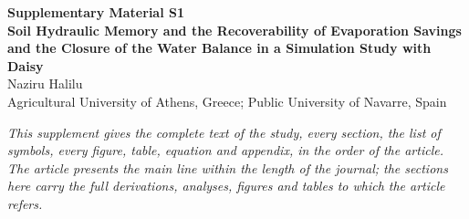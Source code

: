 \documentclass[preprint,12pt,authoryear]{elsarticle}
\begin{document}
\renewcommand{\thesection}{S\arabic{section}}\renewcommand{\thefigure}{S\arabic{figure}}\renewcommand{\thetable}{S\arabic{table}}\renewcommand{\theequation}{S\arabic{equation}}
\begin{center}{\Large\bfseries Supplementary Material S1}\\[6pt]{\large\bfseries Soil Hydraulic Memory and the Recoverability of Evaporation Savings and the Closure of the Water Balance in a Simulation Study with Daisy}\\[8pt]Naziru Halilu\\[2pt]{\small Agricultural University of Athens, Greece; Public University of Navarre, Spain}\end{center}
\noindent\textit{This supplement gives the complete text of the study, every section, the list of symbols, every figure, table, equation and appendix, in the order of the article. The article presents the main line within the length of the journal; the sections here carry the full derivations, analyses, figures and tables to which the article refers.}
\bigskip
\end{document}
